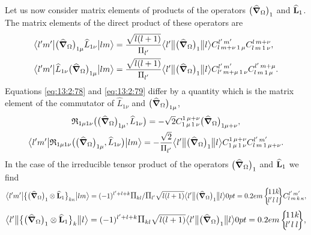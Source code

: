 Let us now consider matrix elements of products of the operators \(\bigl(\widehat{\boldsymbol{\nabla}}_{\Omega}\bigr)_{1}\) and \(\widehat{\mathbf{L}}_{1}\). The matrix elements of the direct product of these operators are
\begin{align}
& 
\braOket{ l^{\prime} m^{\prime}}{\bigl(\delop_{\Omega}\bigr)_{1 \mu} \widehat{L}_{1 \nu}}{l m}=\frac{\sqrt{l(l+1)}}{\Fact{l^{\prime}}}
\braOketred{ l^{\prime}}{\bigl(\delop_{\Omega}\bigr)_{1}}{ l} 
\clebsch{l}{m+\nu}{1}{\mu}{l^{\prime}}{m^{\prime}} 
\clebsch{l}{m}{1}{\nu}{l}{m+\nu},  \label{eq:13:2:78}\\
& 
\braOket{ l^{\prime} m^{\prime}}{ \widehat{L}_{1 \nu}\bigl(\delop_{\Omega}\bigr)_{1 \mu}}{l m}=\frac{\sqrt{l(l+1)}}{\Fact{l^{\prime}}}
\braOketred{ l^{\prime}}{\bigl(\delop_{\Omega}\bigr)_{1}}{ l} 
\clebsch{l^{\prime}}{m+\mu}{1}{\nu}{l^{\prime}}{m^{\prime}} 
\clebsch{l}{m}{1}{\mu}{l^{\prime}}{m+\mu}. \label{eq:13:2:79}
\end{align}
Equations \eqref{eq:13:2:78} and \eqref{eq:13:2:79} differ by a quantity which is the matrix element of the commutator of \(\widehat{L}_{1 \nu}\) and \(\bigl(\widehat{\boldsymbol{\nabla}}_{\Omega}\bigr)_{1 \mu}\),
\begin{gather}
\mathfrak{R}_{1 \mu 1 \nu}\bigl(\bigl(\delop_{\Omega}\bigr)_{1 \mu}, \widehat{L}_{1 \nu}\bigr)=-\sqrt{2} 
\clebsch{1}{\mu}{1}{\nu}{1}{\mu+\nu}\bigl(\delop_{\Omega}\bigr)_{1 \mu+\nu},  \label{eq:13:2:80}\\
\braOket{ l^{\prime} m^{\prime}}{ \mathfrak{R}_{1 \mu 1 \nu}\bigl(\bigl(\delop_{\Omega}\bigr)_{1 \mu}, \widehat{L}_{1 \nu}\bigr)}{l m}=-\frac{\sqrt{2}}{\Fact{l^{\prime}}}
\braOketred{ l^{\prime}}{\bigl(\delop_{\Omega}\bigr)_{1}}{ l} 
\clebsch{1}{\mu}{1}{\nu}{1}{\mu+\nu} 
\clebsch{l}{m}{1}{\mu+\nu}{l^{\prime}}{m^{\prime}}. \label{eq:13:2:81}
\end{gather}
In the case of the irreducible tensor product of the operators \(\bigl(\widehat{\boldsymbol{\nabla}}_{\Omega}\bigr)_{1}\) and \(\widehat{\mathbf{L}}_{1}\) we find
\begin{equation}
\braOket{ l^{\prime} m^{\prime}}{\bigl\{\bigl(\delop_{\Omega}\bigr)_{1} \otimes \widehat{\vect{L}}_{1}\bigr\}_{k \kappa}}{l m}=(-1)^{l^{\prime}+l+k} \Fact{k l}/\Fact{l^\prime}\sqrt{l(l+1)}
\braOketred{ l^{\prime}}{\bigl(\delop_{\Omega}\bigr)_{1}}{ l}
\sixj{1}{1}{k}{l^{\prime}}{l}{l} 
\clebsch{l}{m}{k}{\kappa}{l^{\prime}}{m^{\prime}},  \label{eq:13:2:82}
\end{equation}
\begin{equation*}
\braOketred{ l^{\prime}}{\bigl\{\bigl(\delop_{\Omega}\bigr)_{1} \otimes \widehat{\vect{L}}_{1}\bigr\}_{k}}{ l}=(-1)^{l^{\prime}+l+k} \Fact{k l}\sqrt{l(l+1)}
\braOketred{ l^{\prime}}{\bigl(\delop_{\Omega}\bigr)_{1}}{ l}
\sixj{1}{1}{k}{l^{\prime}}{l}{l},
\end{equation*}
